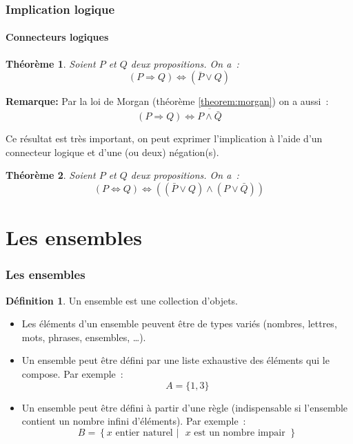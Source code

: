 \documentclass[10pt,notheorems]{beamer}
\theoremstyle{plain}
\newtheorem{theorem}{Théorème}
\theoremstyle{definition} %
\newtheorem{definition}{Définition}
\begin{document}
\begin{frame}
  \frametitle{Implication logique}
  \framesubtitle{Connecteurs logiques}

  \begin{theorem}\label{theorem:implication:connecteurs}
    Soient $P$ et $Q$ deux propositions. On a :
    \[
      (P \Rightarrow Q) \Leftrightarrow (\bar P \lor Q)
      \]
  \end{theorem}

  \bigskip

  \textbf{Remarque:} Par la loi de Morgan (théorème \autoref{theorem:morgan}) on a aussi :
  \[
    (P \Rightarrow Q) \Leftrightarrow \overline{P \land \bar Q}
  \]
  
  Ce résultat est très important, on peut exprimer l'implication à l'aide d'un connecteur logique et d'une (ou deux) négation(s).\newline

  \begin{theorem}\label{theorem:equivalence:connecteurs}
    Soient $P$ et $Q$ deux propositions. On a :
    \[
      (P \Leftrightarrow Q) \Leftrightarrow \left((\bar P \lor Q) \land (P \lor \bar Q)\right)
    \]
  \end{theorem}

\end{frame}

\section{Les ensembles}

\begin{frame}
  \frametitle{Les ensembles}

  \begin{definition}
    Un ensemble est une collection d'objets.
  \end{definition}

  \medskip
  
  \begin{itemize}
  \item Les éléments d'un ensemble peuvent être de types variés (nombres, lettres, mots, phrases, ensembles, \ldots).\newline
  \item Un ensemble peut être défini par une liste exhaustive des éléments qui le compose. Par exemple :
    \[
      A = \{1,3\}
    \]
  \item Un ensemble peut être défini à partir d'une règle (indispensable si l'ensemble contient un nombre infini d'éléments). Par exemple :
    \[
      B = \left\{ x \text{ entier naturel } | \text{ } x \text{ est un nombre impair }\right\}
    \]
  \end{itemize}

\end{frame}
\end{document}

